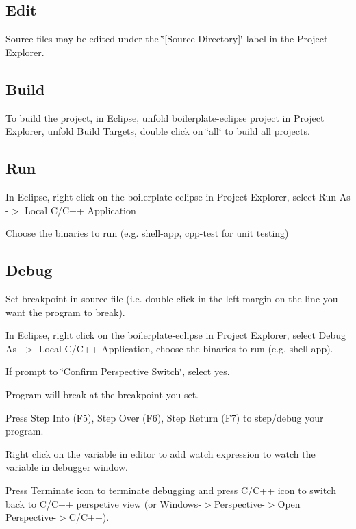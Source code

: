 \subsection*{Edit}

Source files may be edited under the \char`\"{}\mbox{[}\+Source Directory\mbox{]}\char`\"{} label in the Project Explorer.

\subsection*{Build}

To build the project, in Eclipse, unfold boilerplate-\/eclipse project in Project Explorer, unfold Build Targets, double click on \char`\"{}all\char`\"{} to build all projects.

\subsection*{Run}


\begin{DoxyEnumerate}
\item In Eclipse, right click on the boilerplate-\/eclipse in Project Explorer, select Run As -\/$>$ Local C/\+C++ Application
\item Choose the binaries to run (e.\+g. shell-\/app, cpp-\/test for unit testing)
\end{DoxyEnumerate}

\subsection*{Debug}


\begin{DoxyEnumerate}
\item Set breakpoint in source file (i.\+e. double click in the left margin on the line you want the program to break).
\item In Eclipse, right click on the boilerplate-\/eclipse in Project Explorer, select Debug As -\/$>$ Local C/\+C++ Application, choose the binaries to run (e.\+g. shell-\/app).
\item If prompt to \char`\"{}\+Confirm Perspective Switch\char`\"{}, select yes.
\item Program will break at the breakpoint you set.
\item Press Step Into (F5), Step Over (F6), Step Return (F7) to step/debug your program.
\item Right click on the variable in editor to add watch expression to watch the variable in debugger window.
\item Press Terminate icon to terminate debugging and press C/\+C++ icon to switch back to C/\+C++ perspetive view (or Windows-\/$>$Perspective-\/$>$Open Perspective-\/$>$C/\+C++).
\end{DoxyEnumerate}


